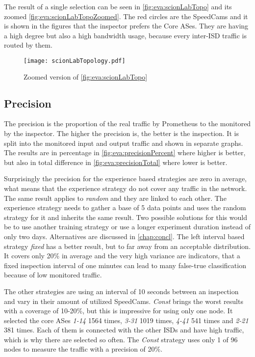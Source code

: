 \documentclass[thesis.tex]{subfiles}
\begin{document}
The result of a single selection can be seen in \autoref{fig:eva:scionLabTopo} and its zoomed \autoref{fig:eva:scionLabTopoZoomed}. The red circles are the SpeedCams and it is shown in the figures that the inspector prefers the Core ASes. They are having a high degree but also a high bandwidth usage, because every inter-ISD traffic is routed by them. 

\begin{figure}
	\centering
	\texttt{[image: scionLabTopology.pdf]}
	\caption{Zoomed version of \autoref{fig:eva:scionLabTopo}}
	\label{fig:eva:scionLabTopoZoomed}
\end{figure}

\subsection{Precision} \label{sec:eva:precision}

The precision is the proportion of the real traffic by Prometheus to the monitored by the inspector. The higher the precision is, the better is the inspection. It is split into the monitored input and output traffic and shown in separate graphs. The results are in percentage in \autoref{fig:eva:precisionPercent} where higher is better, but also in total difference in \autoref{fig:eva:precisionTotal} where lower is better.

Surprisingly the precision for the experience based strategies are zero in average, what means that the experience strategy do not cover any traffic in the network. The same result applies to \textit{random} and they are linked to each other. The experience strategy needs to gather a base of 5 data points and uses the random strategy for it and inherits the same result. Two possible solutions for this would be to use another training strategy or use a longer experiment duration instead of only two days. Alternatives are discussed in \autoref{chap:concl}. The left interval based strategy \textit{fixed} has a better result, but to far away from an acceptable distribution. It covers only 20\% in average and the very high variance are indicators, that a fixed inspection interval of one minutes can lead to many false-true classification because of low monitored traffic.

The other strategies are using an interval of 10 seconds between an inspection and vary in their amount of utilized SpeedCams. \textit{Const} brings the worst results with a coverage of 10-20\%, but this is impressive for using only one node. It selected the core ASes \textit{1-14} 1564 times, \textit{3-31} 1019 times, \textit{4-41} 541 times and \textit{2-21} 381 times. Each of them is connected with the other ISDs and have high traffic, which is why there are selected so often. The \textit{Const} strategy uses only 1 of 96 nodes to measure the traffic with a precision of 20\%.
\end{document}
